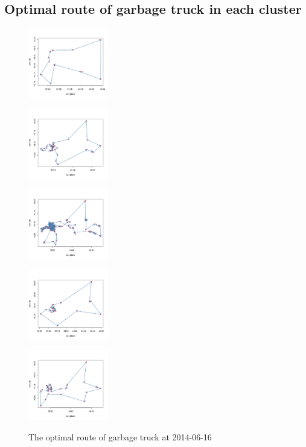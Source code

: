 \documentclass[conference]{IEEEtran}
\begin{document}
\subsection{Optimal route of garbage truck in each cluster}

\begin{figure}
	\centering
	\begin{minipage}{3.5cm}
		\includegraphics[width=3.5cm]{Cluster1}
		\label{fig1a}
			\end{minipage}
	\begin{minipage}{3.5cm}
		\includegraphics[width=3.5cm]{Cluster2}
		\label{fig1b}
	\end{minipage}
	
	
		\begin{minipage}{3.5cm}
		\includegraphics[width=3.5cm]{Cluster3}
		\label{fig1a}
			\end{minipage}
	\begin{minipage}{3.5cm}
		\includegraphics[width=3.5cm]{Cluster4}
		\label{fig1b}
	\end{minipage}
	
	
	\begin{minipage}{5cm}
		\includegraphics[width=3.5cm]{Cluster5}
		\label{fig1b}
	\end{minipage}
	\caption{The optimal route of garbage truck at 2014-06-16}
	\label{fig5}
	
\end{figure}
\end{document}
